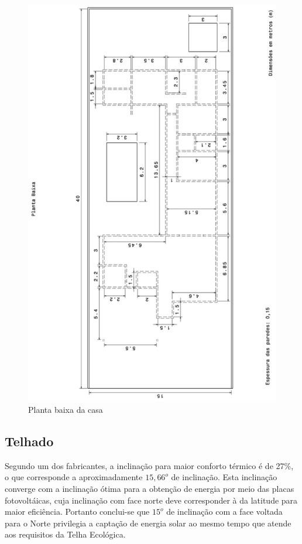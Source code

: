 \begin{figure}[H]
  \begin{center}
	\includegraphics[keepaspectratio,scale=0.45,angle=270]{figuras/planta_baixa.eps}
	\caption{Planta baixa da casa}
  \end{center}
\end{figure}


\subsection{Telhado}

Segundo um dos fabricantes, a inclinação para maior conforto térmico é de 27\%, o que corresponde a aproximadamente $15,66^o$ de inclinação. Esta inclinação converge com a inclinação ótima para a obtenção de energia por meio das placas fotovoltáicas, cuja inclinação com face norte deve corresponder à da latitude para maior eficiência. Portanto conclui-se que $15^o$ de inclinação com a face voltada para o Norte privilegia a captação de energia solar ao mesmo tempo que atende aos requisitos da Telha Ecológica\cite{2013Onduline}\cite{2013Portal}.

